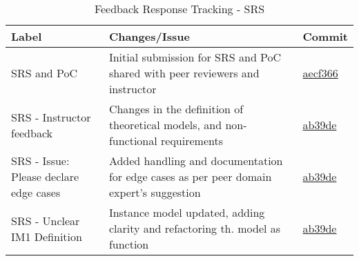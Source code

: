 \documentclass{article}
\begin{document}
\begin{table}[h]
    \centering
    \caption{Feedback Response Tracking - SRS}
    \label{tab:feedbackSRS}
    \begin{tabularx}{\textwidth}{|>{\raggedright\arraybackslash}p{}|>{\raggedright\arraybackslash}X|>{\raggedright\arraybackslash}p{}|}
        \hline
        \textbf{Label} & \textbf{Changes/Issue} & \textbf{Commit} \\
        \hline\hline
        SRS and PoC & Initial submission for SRS and PoC shared with peer reviewers and instructor & \href{https://github.com/UGarCil/UGarcil_capstone/tree/aecf366c770d223f83eb9bfa6c4c393a2deb07d8}{aecf366} \\
        \hline
        SRS - Instructor feedback & Changes in the definition of theoretical models, and non-functional requirements & \href{https://github.com/UGarCil/UGarcil_capstone/commit/ab39de66f9337a4d7b16575f4caf76358bb562ad}{ab39de} \\
        \hline
        SRS - Issue: Please declare edge cases & Added handling and documentation for edge cases as per peer domain expert's suggestion & \href{https://github.com/UGarCil/UGarcil_capstone/commit/ab39de66f9337a4d7b16575f4caf76358bb562ad}{ab39de} \\
        \hline
        SRS - Unclear IM1 Definition & Instance model updated, adding clarity and refactoring th. model as function & \href{https://github.com/UGarCil/UGarcil_capstone/commit/ab39de66f9337a4d7b16575f4caf76358bb562ad}{ab39de} \\
        \hline
    \end{tabularx}
\end{table}
\newpage
\end{document}

